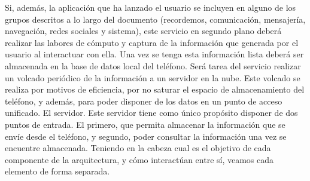 \documentclass[12pt,a4paper,oneside]{book} %
\begin{document}
Si, además, la aplicación que ha lanzado el usuario se incluyen en alguno de los grupos descritos a lo largo del documento (recordemos, comunicación, mensajería, navegación, redes sociales y sistema), este servicio en segundo plano deberá realizar las labores de cómputo y captura de la información que generada por el usuario al interactuar con ella.
\newline \newline 
Una vez se tenga esta información lista deberá ser almacenada en la base de datos local del teléfono. Será tarea del servicio realizar un volcado periódico de la información a un servidor en la nube. 
\newline \newline 
Este volcado se realiza por motivos de eficiencia, por no saturar el espacio de almacenamiento del teléfono, y además, para poder disponer de los datos en un punto de acceso unificado. El servidor. 
\newline \newline 
Este servidor tiene como único propósito disponer de dos puntos de entrada. El primero, que permita almacenar la información que se envíe desde el teléfono, y segundo, poder consultar la información una vez se encuentre almacenada. 
\newline \newline 
Teniendo en la cabeza cual es el objetivo de cada componente de la arquitectura, y cómo interactúan entre sí, veamos cada elemento de forma separada. 
\end{document}

